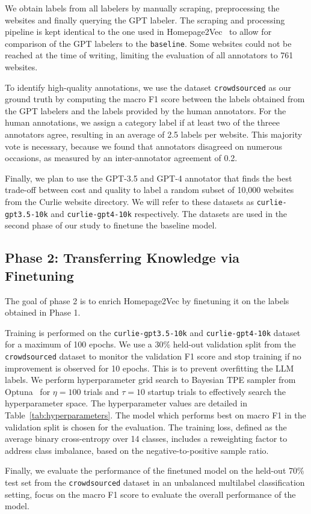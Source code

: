 We obtain labels from all labelers by manually scraping, preprocessing the websites and finally querying the GPT labeler. The scraping and processing pipeline is kept identical to the one used in Homepage2Vec~\cite{homepage2vec} to allow for comparison of the GPT labelers to the \texttt{baseline}. Some websites could not be reached at the time of writing, limiting the evaluation of all annotators to 761 websites.

To identify high-quality annotations, we use the dataset \texttt{crowdsourced} as our ground truth by computing the macro F1 score between the labels obtained from the GPT labelers and the labels provided by the human annotators. For the human annotations, we assign a category label if at least two of the threee annotators agree, resulting in an average of 2.5 labels per website. This majority vote is necessary, because we found that annotators disagreed on numerous occasions, as measured by an inter-annotator agreement of 0.2.

Finally, we plan to use the GPT-3.5 and GPT-4 annotator that finds the best trade-off between cost and quality to label a random subset of 10,000 websites from the Curlie website directory. We will refer to these datasets as \texttt{curlie-gpt3.5-10k} and \texttt{curlie-gpt4-10k} respectively. The datasets are used in the second phase of our study to finetune the baseline model.

\subsection*{Phase 2: Transferring Knowledge via Finetuning}

The goal of phase 2 is to enrich Homepage2Vec by finetuning it on the labels obtained in Phase 1.

Training is performed on the \texttt{curlie-gpt3.5-10k} and \texttt{curlie-gpt4-10k} dataset for a maximum of 100 epochs. We use a 30\% held-out validation split from the \texttt{crowdsourced} dataset to monitor the validation F1 score and stop training if no improvement is observed for 10 epochs. This is to prevent overfitting the LLM labels. We perform hyperparameter grid search to Bayesian TPE sampler from Optuna~\cite{optuna} for $\eta=100$ trials and $\tau=10$ startup trials to effectively search the hyperparameter space. The hyperparameter values are detailed in Table~\ref{tab:hyperparameters}. The model which performs best on macro F1 in the validation split is chosen for the evaluation.
The training loss, defined as the average binary cross-entropy over 14 classes, includes a reweighting factor to address class imbalance, based on the negative-to-positive sample ratio.



Finally, we evaluate the performance of the finetuned model on the held-out 70\% test set from the \texttt{crowdsourced} dataset in an unbalanced multilabel classification setting, focus on the macro F1 score to evaluate the overall performance of the model.
